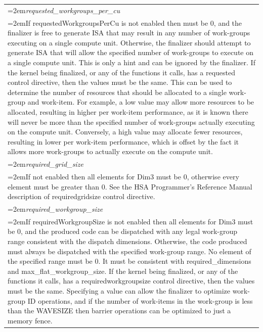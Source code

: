 \documentclass[final,oneside]{book}
\newcommand{\reffld}[1]{\textit{#1}}
\begin{document}
\begin{longtable}{@{}>{\hangindent=2em}p{\textwidth}}
\hypertarget{hsa_\-ext_\-control_\-directives_\-t.requested_\-workgroups_\-per_\-cu}{\reffld{requested_\-workgroups_\-per_\-cu}}\\\hspace{2em}If requestedWorkgroupsPerCu is not enabled then must be 0, and the finalizer is free to generate ISA that may result in any number of work-groups executing on a single compute unit. Otherwise, the finalizer should attempt to generate ISA that will allow the specified number of work-groups to execute on a single compute unit. This is only a hint and can be ignored by the finalizer. If the kernel being finalized, or any of the functions it calls, has a requested control directive, then the values must be the same. This can be used to determine the number of resources that should be allocated to a single work-group and work-item. For example, a low value may allow more resources to be allocated, resulting in higher per work-item performance, as it is known there will never be more than the specified number of work-groups actually executing on the compute unit. Conversely, a high value may allocate fewer resources, resulting in lower per work-item performance, which is offset by the fact it allows more work-groups to actually execute on the compute unit.\\[2mm]
\hypertarget{hsa_\-ext_\-control_\-directives_\-t.required_\-grid_\-size}{\reffld{required_\-grid_\-size}}\\\hspace{2em}If not enabled then all elements for Dim3 must be 0, otherwise every element must be greater than 0. See the HSA Programmer's Reference Manual description of requiredgridsize control directive.\\[2mm]
\hypertarget{hsa_\-ext_\-control_\-directives_\-t.required_\-workgroup_\-size}{\reffld{required_\-workgroup_\-size}}\\\hspace{2em}If requiredWorkgroupSize is not enabled then all elements for Dim3 must be 0, and the produced code can be dispatched with any legal work-group range consistent with the dispatch dimensions. Otherwise, the code produced must always be dispatched with the specified work-group range. No element of the specified range must be 0. It must be consistent with required_\-dimensions and max_\-flat_\-workgroup_\-size. If the kernel being finalized, or any of the functions it calls, has a requiredworkgroupsize control directive, then the values must be the same. Specifying a value can allow the finalizer to optimize work-group ID operations, and if the number of work-items in the work-group is less than the WAVESIZE then barrier operations can be optimized to just a memory fence.\\[2mm]

\end{longtable}
\end{document}

